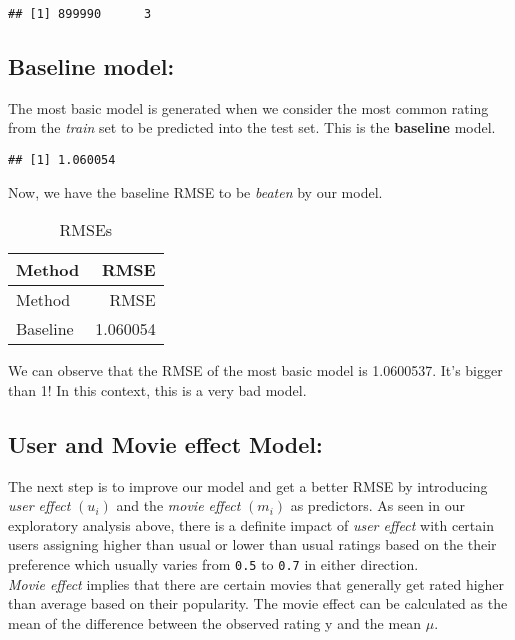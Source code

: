\documentclass[
]{article}
\begin{document}
\begin{verbatim}
## [1] 899990      3
\end{verbatim}

\hypertarget{baseline-model}{%
\subsection{\texorpdfstring{\textbf{Baseline
model:}}{Baseline model:}}\label{baseline-model}}

The most basic model is generated when we consider the most common
rating from the \emph{train} set to be predicted into the test set. This
is the \textbf{baseline} model.

\begin{verbatim}
## [1] 1.060054
\end{verbatim}

Now, we have the baseline RMSE to be \emph{beaten} by our model.

\begin{longtable}[]{@{}lr@{}}
\caption{RMSEs}\tabularnewline
\toprule
Method & RMSE\tabularnewline
\midrule
\endfirsthead
\toprule
Method & RMSE\tabularnewline
\midrule
\endhead
Baseline & 1.060054\tabularnewline
\bottomrule
\end{longtable}

We can observe that the RMSE of the most basic model is 1.0600537. It's
bigger than 1! In this context, this is a very bad model.

\hypertarget{user-and-movie-effect-model}{%
\subsection{\texorpdfstring{\textbf{User and Movie effect
Model:}}{User and Movie effect Model:}}\label{user-and-movie-effect-model}}

The next step is to improve our model and get a better RMSE by
introducing \emph{user effect} \((u_i)\) and the \emph{movie effect}
\((m_i)\) as predictors. As seen in our exploratory analysis above,
there is a definite impact of \emph{user effect} with certain users
assigning higher than usual or lower than usual ratings based on the
their preference which usually varies from \texttt{0.5} to \texttt{0.7}
in either direction.\\
\emph{Movie effect} implies that there are certain movies that generally
get rated higher than average based on their popularity. The movie
effect can be calculated as the mean of the difference between the
observed rating y and the mean \(\mu\).
\end{document}
